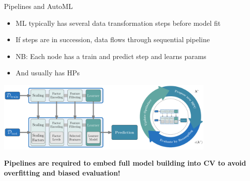 \documentclass[11pt,compress,t,notes=noshow, xcolor=table]{beamer}
\begin{document}
\begin{vbframe}{Pipelines and AutoML}
\begin{itemize}
    \item ML typically has several data transformation steps before model fit
    \item If steps are in succession, data flows through sequential pipeline
    \item NB: Each node has a train and predict step and learns params
    \item And usually has HPs
\end{itemize}


\vspace{0.5em}

\begin{center}
\includegraphics[width = 0.8\textwidth]{figure_man/linear_pipeline.png}
\end{center}

\vspace{0.5em}

\textbf{Pipelines are required to embed full model building into CV to avoid overfitting and biased evaluation!}
\end{vbframe}
\end{document}
